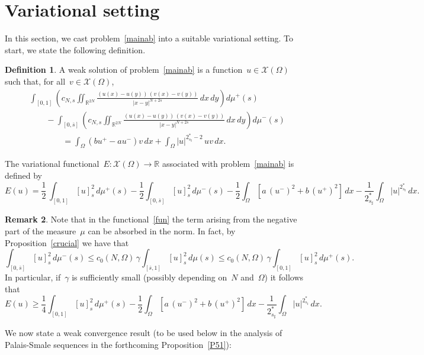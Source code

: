 \documentclass[12pt,a4paper,intlimits,sumlimits]{amsart}
\def \R {\mathbb{R}}
\newcommand{\half}{\frac{1}{2}}
\theoremstyle{definition}
\newtheorem{definition}{Definition}[section]
\newtheorem{remark}[definition]{Remark}
\theoremstyle{plain}
\numberwithin{equation}{section}
\renewcommand{\le}{\leqslant}
\renewcommand{\ge}{\geqslant}
\begin{document}
\section{Variational setting}\label{KAMqw}
In this section, we cast problem~\eqref{mainab} into a suitable variational setting.
To start, we state the following definition.
\begin{definition}\label{wsol2}
A weak solution of problem~\eqref{mainab} is a function~$u \in \mathcal{X}(\Omega)$ such that, for all~$ v \in \mathcal{X}(\Omega)$,
\[
\begin{split}
&\int_{[{{ 0 }}, 1]}\left(c_{N,s}\iint_{\R^{2N}} \frac{(u(x) - u(y))\, (v(x) - v(y))}{|x - y|^{N+2s}}\, dx\, dy\right) d\mu^+(s)\\
&\qquad- \int_{[{{ 0 }}, \overline s]}\left(c_{N,s}\iint_{\R^{2N}} \frac{(u(x) - u(y))\, (v(x) - v(y))}{|x - y|^{N+2s}}\, dx\, dy\right) d\mu^-(s)\\
&\qquad\qquad= \int_{\Omega} (bu^+ - a u^-) v\, dx + \int_\Omega |u|^{2_{s_\sharp}^\ast - 2}\, uv\, dx.
\end{split}
\]
\end{definition}

The variational functional~$E: \mathcal{X}(\Omega)\to \R$ associated with problem~\eqref{mainab} is defined by
\begin{equation}\label{fun}
E(u) = \half \,\int_{[{{ 0 }}, 1]} [u]^2_{s}\, d\mu^+ (s)
 -\half\int_{[{{ 0 }}, \overline s]} [u]^2_s\, d\mu^-(s) - \half \int_\Omega \left[a\, (u^-)^2 + b\, (u^+)^2\right]\, dx - \frac{1}{2_{s_\sharp}^*} \int_\Omega |u|^{2_{s_\sharp}^*}\, dx.
\end{equation}
\begin{remark}
Note that in the functional~\eqref{fun} the term arising from the negative part of the measure~$\mu$ can be absorbed in the norm. In fact, by Proposition~\ref{crucial} we have that
\[
\int_{[{{ 0 }}, \overline s]} [u]_s^2 \, d\mu^- (s) \le c_0(N,\Omega) \,\gamma\int_{[\overline s, 1]} [u]^2_s \, d\mu(s) \le c_0(N,\Omega) \,\gamma\int_{[{{ 0 }}, 1]} [u]^2_{s}\, d\mu^+ (s).
\]
In particular, if~$\gamma$ is sufficiently small (possibly depending on~$N$ and~$\Omega$) it follows that
\[
E(u) \ge \frac{1}{4}\int_{[{{ 0 }}, 1]} [u]^2_{s}\, d\mu^+ (s)
- \half \int_\Omega \left[a\, (u^-)^2 + b\, (u^+)^2\right] \,dx - \frac{1}{2_{s_\sharp}^*} \int_\Omega |u|^{2_{s_\sharp}^*}\, dx.
\]
\end{remark}

We now state a weak convergence result (to be used below in the analysis of
Palais-Smale sequences in the forthcoming Proposition~\ref{P51}):
\end{document}
